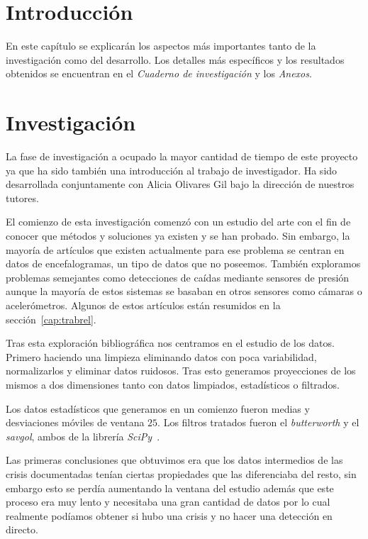 \section{Introducción}\label{cap:asp-rel}

En este capítulo se explicarán los aspectos más importantes tanto de la investigación como del desarrollo. Los detalles más específicos y los resultados obtenidos se encuentran en el \textit{Cuaderno de investigación} y los \textit{Anexos}. 

\section{Investigación}

La fase de investigación a ocupado la mayor cantidad de tiempo de este proyecto ya que ha sido también una introducción al trabajo de investigador. Ha sido desarrollada conjuntamente con Alicia Olivares Gil bajo la dirección de nuestros tutores.

El comienzo de esta investigación comenzó con un estudio del arte con el fin de conocer que métodos y soluciones ya existen y se han probado. Sin embargo, la mayoría de artículos que existen actualmente para ese problema se centran en datos de encefalogramas, un tipo de datos que no poseemos. También exploramos problemas semejantes como detecciones de caídas mediante sensores de presión aunque la mayoría de estos sistemas se basaban en otros sensores como cámaras o acelerómetros. Algunos de estos artículos están resumidos en la sección~\ref{cap:trabrel}.

Tras esta exploración bibliográfica nos centramos en el estudio de los datos. Primero haciendo una limpieza eliminando datos con poca variabilidad, normalizarlos y eliminar datos ruidosos. Tras esto generamos proyecciones de los mismos a dos dimensiones tanto con datos limpiados, estadísticos o filtrados.

Los datos estadísticos que generamos en un comienzo fueron medias y desviaciones móviles de ventana $25$. Los filtros tratados fueron el \textit{butterworth} y el \textit{savgol}, ambos de la librería \textit{SciPy}~\cite{tool:scipy}.

Las primeras conclusiones que obtuvimos era que los datos intermedios de las crisis documentadas tenían ciertas propiedades que las diferenciaba del resto, sin embargo esto se perdía aumentando la ventana del estudio además que este proceso era muy lento y necesitaba una gran cantidad de datos por lo cual realmente podíamos obtener si hubo una crisis y no hacer una detección en directo.


